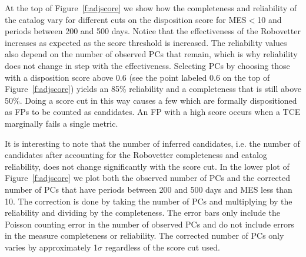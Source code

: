 At the top of Figure~\ref{f:adjscore} we show how the completeness and reliability of the catalog vary for different cuts on the disposition score for MES$<$10 and periods between 200 and 500 days. Notice that the effectiveness of the Robovetter increases as expected as the score threshold is increased. The reliability values also depend on the number of observed PCs that remain, which is why reliability does not change in step with the effectiveness. Selecting PCs by choosing those with a disposition score above 0.6 (see the point labeled 0.6 on the top of Figure~\ref{f:adjscore}) yields an 85\% reliability and a completeness that is still above 50\%. Doing a score cut in this way causes a few  which are formally dispositioned as FPs to be counted as candidates. An FP with a high score occurs when a TCE marginally fails a single metric.  

It is interesting to note that the number of inferred candidates, i.e. the number of candidates after accounting for the Robovetter completeness and catalog reliability, does not change significantly with the score cut. In the lower plot of Figure~\ref{f:adjscore} we plot both the observed number of PCs and the corrected number of PCs that have periods between 200 and 500 days and MES less than 10.  The correction is done by taking the number of PCs and multiplying by the reliability and dividing by the completeness.  The error bars only include the Poisson counting error in the number of observed PCs and do not include errors in the measure completeness or reliability. The corrected number of PCs only varies by approximately 1$\sigma$ regardless of the score cut used.   

